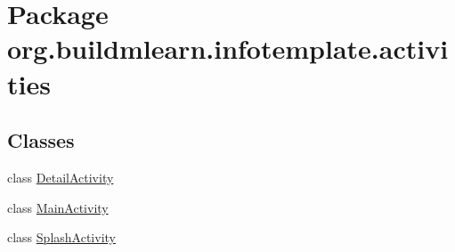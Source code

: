 \hypertarget{namespaceorg_1_1buildmlearn_1_1infotemplate_1_1activities}{}\section{Package org.\+buildmlearn.\+infotemplate.\+activities}
\label{namespaceorg_1_1buildmlearn_1_1infotemplate_1_1activities}
\subsection*{Classes}
\begin{DoxyCompactItemize}
\item 
class \hyperlink{classorg_1_1buildmlearn_1_1infotemplate_1_1activities_1_1DetailActivity}{Detail\+Activity}
\item 
class \hyperlink{classorg_1_1buildmlearn_1_1infotemplate_1_1activities_1_1MainActivity}{Main\+Activity}
\item 
class \hyperlink{classorg_1_1buildmlearn_1_1infotemplate_1_1activities_1_1SplashActivity}{Splash\+Activity}
\end{DoxyCompactItemize}
